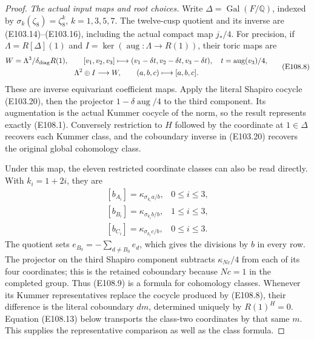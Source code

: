 \begin{proof}
\emph{The actual input maps and root choices.}
Write $\Delta=\operatorname{Gal}(F/\mathbb Q)$, indexed by
$\sigma_k(\zeta_8)=\zeta_8^k$, $k=1,3,5,7$.
The twelve-cusp quotient and its inverse are (E103.14)--(E103.16),
including the actual compact map $j_*/4$.
For precision, if $\Lambda=R[\Delta](1)$ and
$I=\ker(\operatorname{aug}:\Lambda\to R(1))$, their toric maps are
\[
 \begin{gathered}
 W=\Lambda^3/\delta_{\rm diag}R(1),\qquad
 [v_1,v_2,v_3]\longmapsto
 (v_1-\delta t,v_2-\delta t,v_3-\delta t),\quad
 t=\operatorname{aug}(v_3)/4,\\
 \Lambda^2\oplus I\longrightarrow W,\qquad
 (a,b,c)\longmapsto[a,b,c].
 \end{gathered}
 \tag{E108.8}
\]
These are inverse equivariant coefficient maps.  Apply the
literal Shapiro cocycle (E103.20), then the projector
$1-\delta\operatorname{aug}/4$ to the third component.  Its
augmentation is the actual Kummer cocycle of the norm, so the
result represents exactly (E108.1).  Conversely restriction to
$H$ followed by the coordinate at $1\in\Delta$ recovers each
Kummer class, and the coboundary inverse in (E103.20) recovers
the original global cohomology class.

Under this map, the eleven restricted coordinate classes can
also be read directly.  With $k_i=1+2i$, they are
\[
 \begin{array}{ll}
 [b_{A_i}]=\kappa_{\sigma_{k_i}a/b},&0\le i\le3,\\
 {}[b_{B_i}]=\kappa_{\sigma_{k_i}b/b},&1\le i\le3,\\
 {}[b_{C_i}]=\kappa_{\sigma_{k_i}c/b},&0\le i\le3.
 \end{array}
 \tag{E108.9}
\]
The quotient sets $e_{B_0}=-\sum_{d\ne B_0}e_d$, which gives
the divisions by $b$ in every row.  The projector on the third
Shapiro component subtracts $\kappa_{Nc}/4$ from each of its
four coordinates; this is the retained coboundary because
$Nc=1$ in the completed group.  Thus (E108.9) is a formula for
cohomology classes.  Whenever its Kummer representatives replace
the cocycle produced by (E108.8), their difference is the literal
coboundary $dm$, determined uniquely by $R(1)^H=0$.  Equation
(E108.13) below transports the class-two coordinates by that
same $m$.  This supplies the representative comparison as well
as the class formula.


\end{proof}
